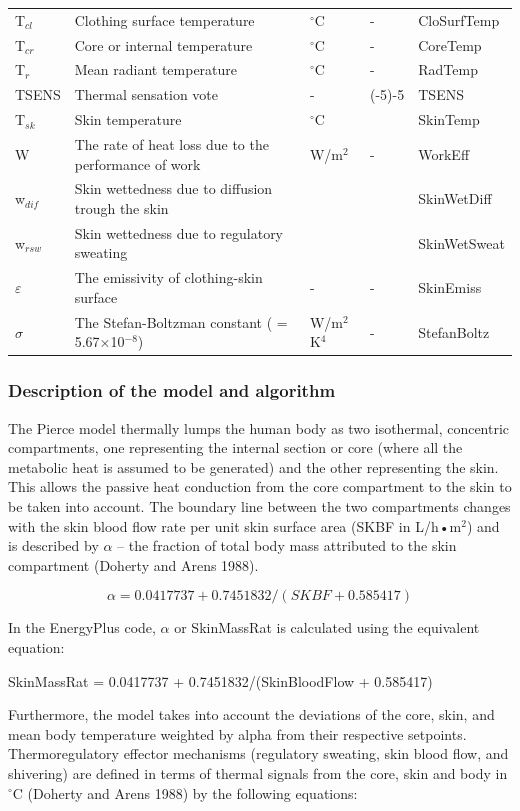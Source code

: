 \begin{longtable}[c]{p{1.2in}p{2.0in}p{0.8in}p{0.8in}p{1.2in}}
T\(_{cl}\) & Clothing surface temperature & \(^{\circ}\)C & - & CloSurfTemp \tabularnewline
T\(_{cr}\) & Core or internal temperature & \(^{\circ}\)C & - & CoreTemp \tabularnewline
T\(_{r}\) & Mean radiant temperature & \(^{\circ}\)C & - & RadTemp \tabularnewline
TSENS & Thermal sensation vote & - & (-5)-5 & TSENS \tabularnewline
T\(_{sk}\) & Skin temperature & \(^{\circ}\)C & ~ & SkinTemp \tabularnewline
W & The rate of heat loss due to the performance of work & W/m\(^{2}\) & - & WorkEff \tabularnewline
w\(_{dif}\) & Skin wettedness due to diffusion trough the skin & ~ & ~ & SkinWetDiff \tabularnewline
w\(_{rsw}\) & Skin wettedness due to regulatory sweating & ~ & ~ & SkinWetSweat \tabularnewline
$\varepsilon$ & The emissivity of clothing-skin surface & - & - & SkinEmiss \tabularnewline
$\sigma$ & The Stefan-Boltzman constant ( = 5.67×10\(^{-8}\)) & W/m\(^{2}\)K\(^{4}\) & - & StefanBoltz \tabularnewline
\bottomrule
\end{longtable}

\subsubsection{Description of the model and algorithm}\label{description-of-the-model-and-algorithm-1}

The Pierce model thermally lumps the human body as two isothermal, concentric compartments, one representing the internal section or core (where all the metabolic heat is assumed to be generated) and the other representing the skin. This allows the passive heat conduction from the core compartment to the skin to be taken into account. The boundary line between the two compartments changes with the skin blood flow rate per unit skin surface area (SKBF in L/h•m\(^{2}\)) and is described by \(\alpha\) -- the fraction of total body mass attributed to the skin compartment (Doherty and Arens 1988).

\begin{equation}
\alpha  = 0.0417737 + 0.7451832/(SKBF + 0.585417)
\end{equation}

In the EnergyPlus code, \(\alpha\) or SkinMassRat is calculated using the equivalent equation:

SkinMassRat = 0.0417737 + 0.7451832/(SkinBloodFlow + 0.585417)

Furthermore, the model takes into account the deviations of the core, skin, and mean body temperature weighted by alpha from their respective setpoints. Thermoregulatory effector mechanisms (regulatory sweating, skin blood flow, and shivering) are defined in terms of thermal signals from the core, skin and body in $^{\circ}$C (Doherty and Arens 1988) by the following equations:

